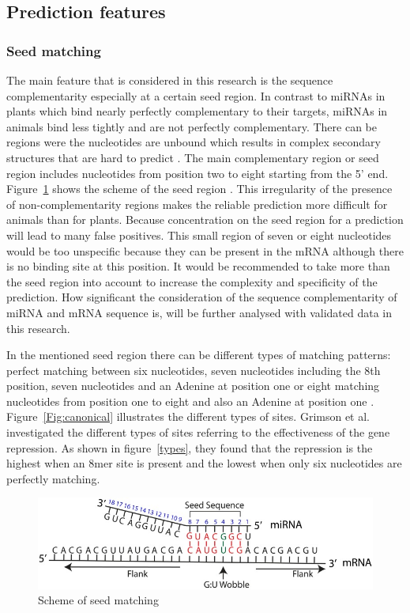 \documentclass[12pt]{article}
\begin{document}
\subsection{Prediction features}
\subsubsection{Seed matching}
The main feature that is considered in this research is the sequence complementarity especially at a certain seed region. In contrast to miRNAs in plants which bind nearly perfectly complementary to their targets, miRNAs in animals bind less tightly and are not perfectly complementary. There can be regions were the nucleotides are unbound which results in complex secondary structures that are hard to predict \cite{Rehmsmeier}. The main complementary region or seed region includes nucleotides from position two to eight starting from the 5' end. Figure~\ref{seed} shows the scheme of the seed region \cite{Peterson}. This irregularity of the presence of non-complementarity regions makes the reliable prediction more difficult for animals than for plants. Because concentration on the seed region for a prediction will lead to many false positives. This small region of seven or eight nucleotides would be too unspecific because they can be present in the mRNA although there is no binding site at this position. It would be recommended to take more than the seed region into account to increase the complexity and specificity of the prediction. How significant the consideration of the sequence complementarity of miRNA and mRNA sequence is, will be further analysed with validated data in this research. 

In the mentioned seed region there can be different types of matching patterns: perfect matching between six nucleotides, seven nucleotides including the 8th position, seven nucleotides and an Adenine at position one or eight matching nucleotides from position one to eight and also an Adenine at position one  \cite{Lewis} \cite{Brennecke} \cite{Krek}. Figure~\ref{Fig:canonical} illustrates the different types of sites. Grimson et al. \cite{Grimson} investigated the different types of sites referring to the effectiveness of the gene repression. As shown in figure~\ref{types}, they found that the repression is the highest when an 8mer site is present and the lowest when only six nucleotides are perfectly matching.


\begin{figure}
\centering
\includegraphics[scale=2.8]{results/seedmatching.png} 
\caption{Scheme of seed matching}
\label{seed}
\end{figure}
\end{document}
